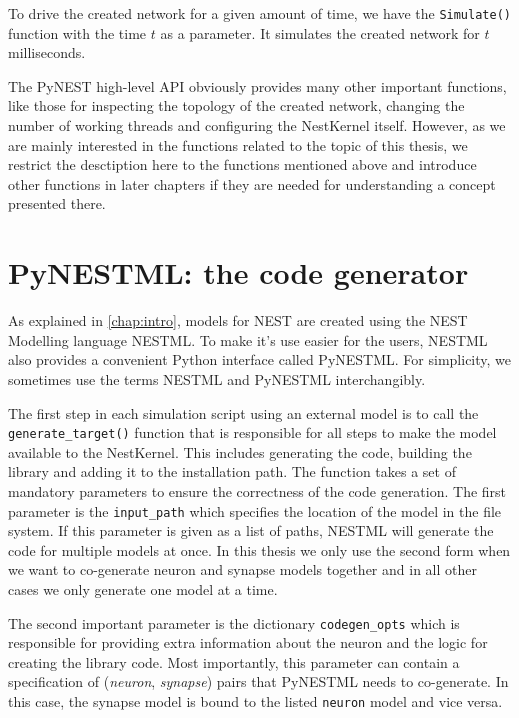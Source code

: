 To drive the created network for a given amount of time, we have the \texttt{Simulate()} function with the time $t$ as a parameter. It simulates the created network for $t$ milliseconds.

The PyNEST high-level API obviously provides many other important functions, like those for inspecting the topology of the created network, changing the number of working threads and configuring the NestKernel itself. However, as we are mainly interested in the functions related to the topic of this thesis, we restrict the desctiption here to the functions mentioned above and introduce other functions in later chapters if they are needed for understanding a concept presented there.

\section{PyNESTML: the code generator}

As explained in \autoref{chap:intro}, models for NEST are created using the NEST Modelling language NESTML. To make it's use easier for the users, NESTML also provides a convenient Python interface called PyNESTML. For simplicity, we sometimes use the terms NESTML and PyNESTML interchangibly.

The first step in each simulation script using an external model is to call the \texttt{generate\_target()} function that is responsible for all steps to make the model available to the NestKernel. This includes generating the code, building the library and adding it to the installation path. The function takes a set of mandatory parameters to ensure the correctness of the code generation. The first parameter is the \texttt{input\_path} which specifies the location of the model in the file system. If this parameter is given as a list of paths, NESTML will generate the code for multiple models at once. In this thesis we only use the second form when we want to co-generate neuron and synapse models together and in all other cases we only generate one model at a time.

The second important parameter is the dictionary \texttt{codegen\_opts} which is responsible for providing extra information about the neuron and the logic for creating the library code. Most importantly, this parameter can contain a specification of (\emph{neuron}, \emph{synapse}) pairs that PyNESTML needs to co-generate. In this case, the synapse model is bound to the listed \texttt{neuron} model and vice versa.

